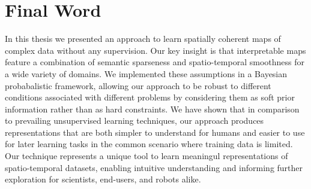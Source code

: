 \section{Final Word}
In this thesis we presented an approach to learn spatially coherent maps of complex data without any supervision. Our key insight is that interpretable maps feature a combination of semantic sparseness and spatio-temporal smoothness for a wide variety of domains. We implemented these assumptions in a Bayesian probabalistic framework, allowing our approach to be robust to different conditions associated with different problems by considering them as soft prior information rather than as hard constraints. We have shown that in comparison to prevailing unsupervised learning techniques, our approach produces representations that are both simpler to understand for humans and easier to use for later learning tasks in the common scenario where training data is limited. Our technique represents a unique tool to learn meaningul representations of spatio-temporal datasets, enabling intuitive understanding and informing further exploration for scientists, end-users, and robots alike.